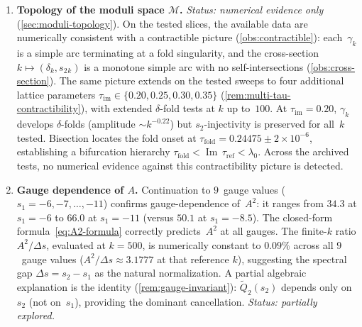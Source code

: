 \documentclass[11pt,a4paper]{article}
\theoremstyle{plain}
\theoremstyle{definition}
\theoremstyle{remark}
\DeclareMathOperator{\Imag}{Im}
\begin{document}
\begin{enumerate}[label=\textbf{OP\arabic*.},nosep]
\item \textbf{Topology of the moduli space $\mathcal{M}$.}
  \emph{Status: numerical evidence only} (\cref{sec:moduli-topology}).
  On the tested slices, the available data are numerically consistent
  with a contractible picture (\cref{obs:contractible}): each~$\gamma_k$
  is a simple arc terminating at a fold singularity, and the cross-section
  $k \mapsto (\delta_k, s_2{}_k)$ is a monotone simple arc
  with no self-intersections (\cref{obs:cross-section}).
  The same picture extends on the tested sweeps to four additional lattice
  parameters $\tau_{\mathrm{im}} \in \{0.20, 0.25, 0.30, 0.35\}$
  (\cref{rem:multi-tau-contractibility}), with extended
  $\delta$-fold tests at $k$ up to~$100$.
  At $\tau_{\mathrm{im}} = 0.20$, $\gamma_k$ develops
  $\delta$-folds (amplitude $\sim k^{-0.22}$) but
  $s_2$-injectivity is preserved for all~$k$ tested.
  Bisection locates the fold onset at
  $\tau_{\mathrm{fold}} = 0.24475 \pm 2 \times 10^{-6}$,
  establishing a bifurcation hierarchy
  $\tau_{\mathrm{fold}} < \Imag\,\tau_{\mathrm{ref}} < \lambda_0$.
  Across the archived tests, no numerical evidence against this
  contractibility picture is detected.

\item \textbf{Gauge dependence of $A$.}
  Continuation to $9$~gauge values ($s_1 = -6, -7, \ldots, -11$) confirms
  gauge-dependence of~$A^2$: it ranges from $34.3$ at $s_1 = -6$ to
  $66.0$ at $s_1 = -11$ (versus $50.1$ at $s_1 = -8.5$).
  The closed-form formula~\eqref{eq:A2-formula}
  correctly predicts~$A^2$ at all gauges.
  The finite-$k$ ratio $A^2/\Delta s$, evaluated at $k=500$, is numerically
  constant to $0.09\%$ across all $9$~gauge values
  ($A^2/\Delta s \approx 3.1777$ at that reference $k$),
  suggesting the spectral gap $\Delta s = s_2 - s_1$ as the
  natural normalization.  A partial algebraic explanation is
  the identity (\cref{rem:gauge-invariant}): $\tilde Q_2(s_2)$ depends
  only on~$s_2$ (not on~$s_1$), providing the dominant cancellation.
  \emph{Status: partially explored.}


\end{enumerate}
\end{document}
